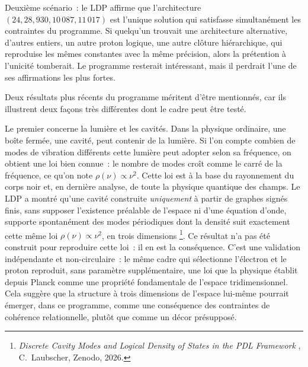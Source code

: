 \documentclass[12pt, a4paper, openright]{book}
\begin{document}
\medskip

Deuxième scénario~: le LDP affirme que l'architecture $(24, 28, 930, 10\,087, 11\,017)$ est l'unique solution qui satisfasse simultanément les contraintes du programme. Si quelqu'un trouvait une architecture alternative, d'autres entiers, un autre proton logique, une autre clôture hiérarchique, qui reproduise les mêmes constantes avec la même précision, alors la prétention à l'unicité tomberait. Le programme resterait intéressant, mais il perdrait l'une de ses affirmations les plus fortes.

\medskip

Deux résultats plus récents du programme méritent d'être mentionnés, car ils illustrent deux façons très différentes dont le cadre peut être testé.

\medskip

Le premier concerne la lumière et les cavités. Dans la physique ordinaire, une boîte fermée, une cavité, peut contenir de la lumière. Si l'on compte combien de modes de vibration différents cette lumière peut adopter selon sa fréquence, on obtient une loi bien connue~: le nombre de modes croît comme le carré de la fréquence, ce qu'on note $\rho(\nu) \propto \nu^2$. Cette loi est à la base du rayonnement du corps noir et, en dernière analyse, de toute la physique quantique des champs. Le LDP a montré qu'une cavité construite \emph{uniquement} à partir de graphes signés finis, sans supposer l'existence préalable de l'espace ni d'une équation d'onde, supporte spontanément des modes périodiques dont la densité suit exactement cette même loi $\rho(\nu) \propto \nu^2$, en trois dimensions
\footnote{\textit{Discrete Cavity Modes and Logical Density of States in the PDL Framework}
, C.~Laubscher, Zenodo, 2026.}. Ce résultat n'a pas été construit pour reproduire cette loi~: il en est la conséquence. C'est une validation indépendante et non-circulaire~: le même cadre qui sélectionne l'électron et le proton reproduit, sans paramètre supplémentaire, une loi que la physique établit depuis Planck comme une propriété fondamentale de l'espace tridimensionnel. Cela suggère que la structure à trois dimensions de l'espace lui-même pourrait émerger, dans ce programme, comme une conséquence des contraintes de cohérence relationnelle, plutôt que comme un décor présupposé.

\medskip
\end{document}
